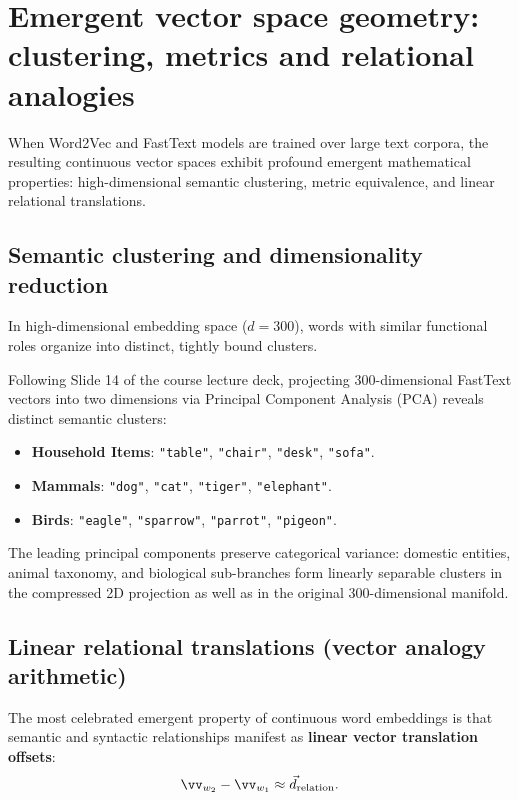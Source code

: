 \documentclass[../../main.tex]{subfiles}
\begin{document}
\section{Emergent vector space geometry: clustering, metrics and relational analogies}
\label{sec:vector_geometry_metrics}

When Word2Vec and FastText models are trained over large text corpora, the resulting continuous vector spaces exhibit profound emergent mathematical properties: high-dimensional semantic clustering, metric equivalence, and linear relational translations.

\subsection{Semantic clustering and dimensionality reduction}
\label{subsec:semantic_clustering_pca}

In high-dimensional embedding space ($d = 300$), words with similar functional roles organize into distinct, tightly bound clusters.

Following Slide 14 of the course lecture deck, projecting 300-dimensional FastText vectors into two dimensions via Principal Component Analysis (PCA) reveals distinct semantic clusters:
\begin{itemize}
    \item \textbf{Household Items}: \texttt{"table"}, \texttt{"chair"}, \texttt{"desk"}, \texttt{"sofa"}.
    \item \textbf{Mammals}: \texttt{"dog"}, \texttt{"cat"}, \texttt{"tiger"}, \texttt{"elephant"}.
    \item \textbf{Birds}: \texttt{"eagle"}, \texttt{"sparrow"}, \texttt{"parrot"}, \texttt{"pigeon"}.
\end{itemize}
The leading principal components preserve categorical variance: domestic entities, animal taxonomy, and biological sub-branches form linearly separable clusters in the compressed 2D projection as well as in the original 300-dimensional manifold.

\subsection{Linear relational translations (vector analogy arithmetic)}
\label{subsec:relational_analogies}

The most celebrated emergent property of continuous word embeddings is that semantic and syntactic relationships manifest as \textbf{linear vector translation offsets}:
\begin{equation}
\label{eq:relational_offset_concept}
\vv_{w_2} - \vv_{w_1} \approx \vec{d}_{\text{relation}}.
\end{equation}
\end{document}
